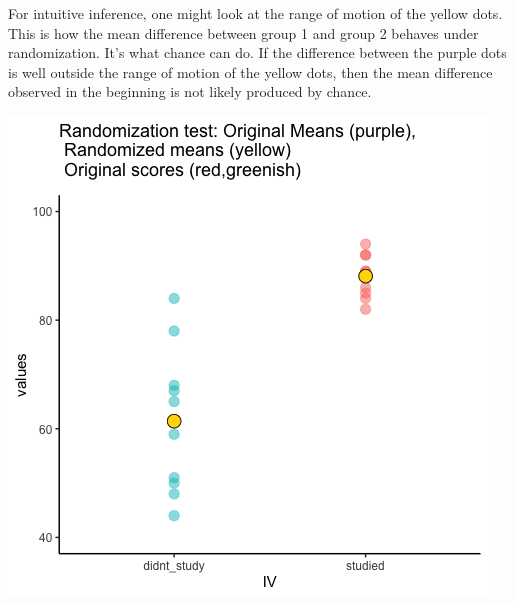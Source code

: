 \documentclass[]{book}
\begin{document}
For intuitive inference, one might look at the range of motion of the yellow dots. This is how the mean difference between group 1 and group 2 behaves under randomization. It's what chance can do. If the difference between the purple dots is well outside the range of motion of the yellow dots, then the mean difference observed in the beginning is not likely produced by chance.

\includegraphics{gifs/randomizationTest-1.gif}
\end{document}
